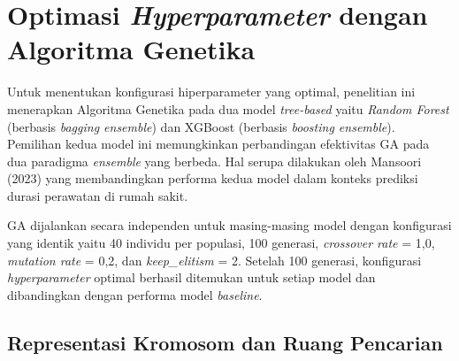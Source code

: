 
\section{Optimasi \textit{Hyperparameter} dengan Algoritma Genetika}
\label{subsec:optimasi_hyperparameter}

Untuk menentukan konfigurasi hiperparameter yang optimal, penelitian ini menerapkan Algoritma Genetika pada dua model \textit{tree-based} yaitu \textit{Random Forest} (berbasis \textit{bagging ensemble}) dan XGBoost (berbasis \textit{boosting ensemble}). Pemilihan kedua model ini memungkinkan perbandingan efektivitas GA pada dua paradigma \textit{ensemble} yang berbeda. Hal serupa dilakukan oleh Mansoori (2023) yang membandingkan performa kedua model dalam konteks prediksi durasi perawatan di rumah sakit.

GA dijalankan secara independen untuk masing-masing model dengan konfigurasi yang identik yaitu 40 individu per populasi, 100 generasi, \textit{crossover rate} = 1,0, \textit{mutation rate} = 0,2, dan \textit{keep\_elitism} = 2. Setelah 100 generasi, konfigurasi \textit{hyperparameter} optimal berhasil ditemukan untuk setiap model dan dibandingkan dengan performa model \textit{baseline}.

\subsection{Representasi Kromosom dan Ruang Pencarian}
\label{subsec:kromosom_ga}

